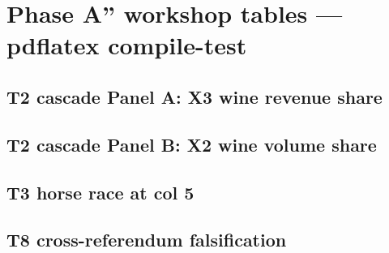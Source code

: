 \documentclass{article}
\begin{document}
\section*{Phase A'' workshop tables --- pdflatex compile-test}

\subsection*{T2 cascade Panel A: X3 wine revenue share}



\subsection*{T2 cascade Panel B: X2 wine volume share}



\subsection*{T3 horse race at col 5}



\subsection*{T8 cross-referendum falsification}


\end{document}
